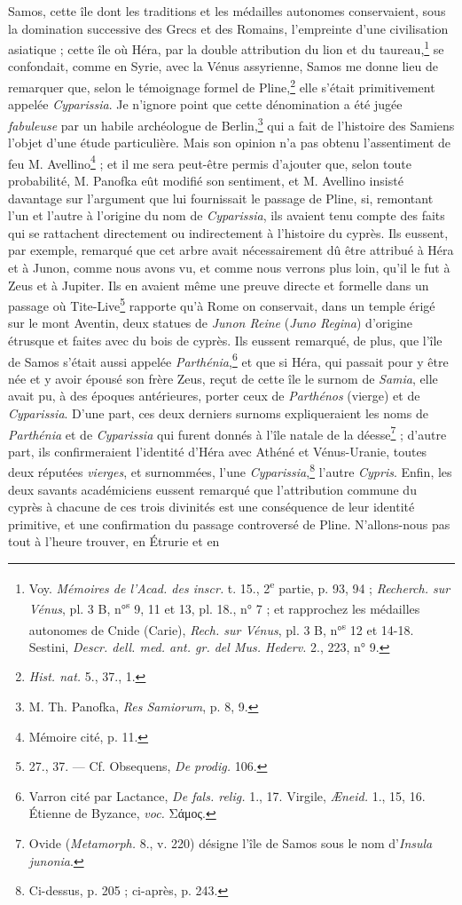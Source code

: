 \documentclass{article}
\begin{document}
Samos, cette île dont les traditions et les médailles autonomes conservaient, sous la domination successive des Grecs et des Romains, l'empreinte d'une civilisation asiatique ; cette île où Héra, par la double attribution du lion et du taureau,\footnote{Voy. \emph{Mémoires de l'Acad. des inscr.} t. 15., 2\textsuperscript{e} partie, p. 93, 94 ; \emph{Recherch. sur Vénus}, pl. 3 B, n°\textsuperscript{s} 9, 11 et 13, pl. 18., n° 7 ; et rapprochez les médailles autonomes de Cnide (Carie), \emph{Rech. sur Vénus}, pl. 3 B, n°\textsuperscript{s} 12 et 14-18. Sestini, \emph{Descr. dell. med. ant. gr. del Mus. Hederv.} 2., 223, n° 9.} se confondait, comme en Syrie, avec la Vénus assyrienne, Samos me donne lieu de remarquer que, selon le témoignage formel de Pline,\footnote{\emph{Hist. nat.} 5., 37., 1.} elle s'était primitivement appelée \emph{Cyparissia}. Je n'ignore point que cette dénomination a été jugée \emph{fabuleuse} par un habile archéologue de Berlin,\footnote{M. Th. Panofka, \emph{Res Samiorum}, p. 8, 9.} qui a fait de l'histoire des Samiens l'objet d'une étude particulière. Mais son opinion n'a pas obtenu l'assentiment de feu M. Avellino\footnote{Mémoire cité, p. 11.} ; et il me sera peut-être permis d'ajouter que, selon toute probabilité, M. Panofka eût modifié son sentiment, et M. Avellino insisté davantage sur l'argument que lui fournissait le passage de Pline, si, remontant l'un et l'autre à l'origine du nom de \emph{Cyparissia}, ils avaient tenu compte des faits qui se rattachent directement ou indirectement à l'histoire du cyprès. Ils eussent, par exemple, remarqué que cet arbre avait nécessairement dû être attribué à Héra et à Junon, comme nous avons vu, et comme nous verrons plus loin, qu'il le fut à Zeus et à Jupiter. Ils en avaient même une preuve directe et formelle dans un passage où Tite-Live\footnote{27., 37. --- Cf. Obsequens, \emph{De prodig.} 106.} rapporte qu'à Rome on conservait, dans un temple érigé sur le mont Aventin, deux statues de \emph{Junon Reine} (\emph{Juno Regina}) d'origine étrusque et faites avec du bois de cyprès. Ils eussent remarqué, de plus, que l'île de Samos s'était aussi appelée \emph{Parthénia},\footnote{Varron cité par Lactance, \emph{De fals. relig.} 1., 17. Virgile, \emph{Æneid.} 1., 15, 16. Étienne de Byzance, \emph{voc.} \textgreek{Σάμος}.} et que si Héra, qui passait pour y être née et y avoir épousé son frère Zeus, reçut de cette île le surnom de \emph{Samia}, elle avait pu, à des époques antérieures, porter ceux de \emph{Parthénos} (vierge) et de \emph{Cyparissia}. D'une part, ces deux derniers surnoms expliqueraient les noms de \emph{Parthénia} et de \emph{Cyparissia} qui furent donnés à l'île natale de la déesse\footnote{Ovide (\emph{Metamorph.} 8., v. 220) désigne l'île de Samos sous le nom d'\emph{Insula junonia}.} ; d'autre part, ils confirmeraient l'identité d'Héra avec Athéné et Vénus-Uranie, toutes deux réputées \emph{vierges}, et surnommées, l'une \emph{Cyparissia},\footnote{Ci-dessus, p. 205 ; ci-après, p. 243.} l'autre \emph{Cypris}. Enfin, les deux savants académiciens eussent remarqué que l'attribution commune du cyprès à chacune de ces trois divinités est une conséquence de leur identité primitive, et une confirmation du passage controversé de Pline. N'allons-nous pas tout à l'heure trouver, en Étrurie et en 
\end{document}

